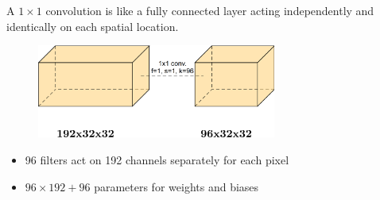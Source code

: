 \documentclass{report}
\begin{document}
\begin{concept}
    A $1 \times 1$ convolution is like a fully connected layer acting independently and identically on each spatial location.

    \begin{figure}[H]
        \centering
        \includegraphics[width=0.7\textwidth]{.././assets/7.11.png}
    \end{figure}

    \begin{itemize}
        \item 96 filters act on 192 channels separately for each pixel
        \item $96 \times 192+96$ parameters for weights and biases
    \end{itemize}
\end{concept}
\end{document}
